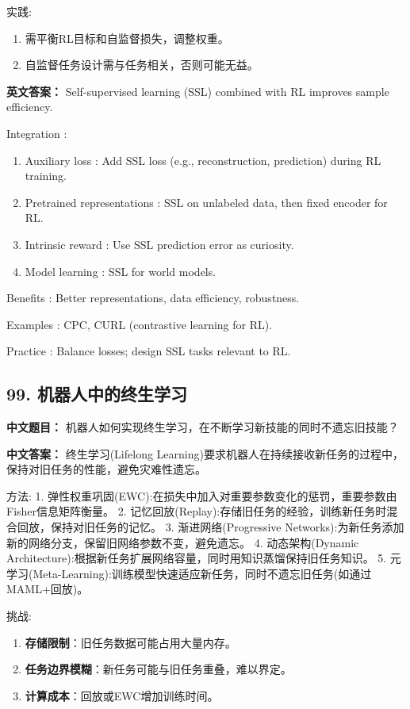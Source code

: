 \documentclass[10pt,a4paper]{ctexart}
\begin{document}
 实践:
\begin{enumerate}
    \item 需平衡RL目标和自监督损失，调整权重。
    \item 自监督任务设计需与任务相关，否则可能无益。
\end{enumerate}

\textbf{英文答案：}  
Self-supervised learning (SSL) combined with RL improves sample efficiency.

 Integration :
\begin{enumerate}
    \item Auxiliary loss : Add SSL loss (e.g., reconstruction, prediction) during RL training.
    \item Pretrained representations : SSL on unlabeled data, then fixed encoder for RL.
    \item Intrinsic reward : Use SSL prediction error as curiosity.
    \item Model learning : SSL for world models.
\end{enumerate}

 Benefits : Better representations, data efficiency, robustness.

 Examples : CPC, CURL (contrastive learning for RL).

 Practice : Balance losses; design SSL tasks relevant to RL.

\subsection*{99. 机器人中的终生学习}
\textbf{中文题目：} 机器人如何实现终生学习，在不断学习新技能的同时不遗忘旧技能？

\textbf{中文答案：}  
终生学习(Lifelong Learning)要求机器人在持续接收新任务的过程中，保持对旧任务的性能，避免灾难性遗忘。

 方法:
1.  弹性权重巩固(EWC):在损失中加入对重要参数变化的惩罚，重要参数由Fisher信息矩阵衡量。
2.  记忆回放(Replay):存储旧任务的经验，训练新任务时混合回放，保持对旧任务的记忆。
3.  渐进网络(Progressive Networks):为新任务添加新的网络分支，保留旧网络参数不变，避免遗忘。
4.  动态架构(Dynamic Architecture):根据新任务扩展网络容量，同时用知识蒸馏保持旧任务知识。
5.  元学习(Meta-Learning):训练模型快速适应新任务，同时不遗忘旧任务(如通过MAML+回放)。

 挑战:
\begin{enumerate}
    \item \textbf{存储限制}：旧任务数据可能占用大量内存。
    \item \textbf{任务边界模糊}：新任务可能与旧任务重叠，难以界定。
    \item \textbf{计算成本}：回放或EWC增加训练时间。
\end{enumerate}
\end{document}
